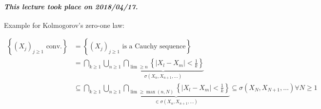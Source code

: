 \documentclass{article}
\newcommand{\set}[1]{\left\{#1\right\}}
\newcommand{\card}[1]{\left|#1\right|}
\newcommand{\dateref}[1]{\paragraph{\textit{This lecture took place on #1.}}}
\begin{document}
\dateref{2018/04/17}

Example for Kolmogorov's zero-one law:

\begin{align*}
  \set{(X_j)_{j \geq 1} \text{ conv.}}
    &= \set{(X_j)_{j \geq 1} \text{ is a Cauchy sequence}} \\
    &= \bigcap_{k \geq 1} \bigcup_{n \geq 1} \underbrace{\bigcap_{\lim \geq n} \set{\card{X_l - X_m} < \frac1k}}_{\sigma(X_n , X_{n+1}, \ldots)} \\
    &\subseteq \bigcap_{k \geq 1} \bigcup_{n \geq 1} \underbrace{\bigcap_{\lim \geq \max(n, N)} \set{\card{X_l - X_m} < \frac1k}}_{\in \sigma(X_n, X_{n+1}, \ldots)} \subseteq \sigma(X_N, X_{N+1}, \ldots) \forall N \geq 1
\end{align*}
\end{document}
